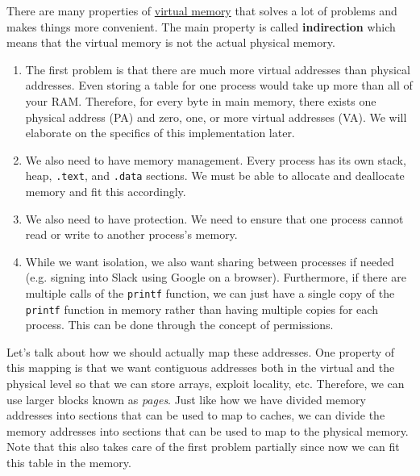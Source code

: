 \documentclass{article}
\begin{document}
    There are many properties of \hyperref[def:virtual-memory]{virtual memory} that solves a lot of problems and makes things more convenient. The main property is called \textbf{indirection} which means that the virtual memory is not the actual physical memory. 
    \begin{enumerate}
      \item The first problem is that there are much more virtual addresses than physical addresses. Even storing a table for one process would take up more than all of your RAM. Therefore, for every byte in main memory, there exists one physical address (PA) and zero, one, or more virtual addresses (VA). We will elaborate on the specifics of this implementation later. 
      \item We also need to have memory management. Every process has its own stack, heap, \texttt{.text}, and \texttt{.data} sections. We must be able to allocate and deallocate memory and fit this accordingly. 
      \item We also need to have protection. We need to ensure that one process cannot read or write to another process's memory.
      \item While we want isolation, we also want sharing between processes if needed (e.g. signing into Slack using Google on a browser). Furthermore, if there are multiple calls of the \texttt{printf} function, we can just have a single copy of the \texttt{printf} function in memory rather than having multiple copies for each process. This can be done through the concept of permissions. 
    \end{enumerate}

    Let's talk about how we should actually map these addresses. One property of this mapping is that we want contiguous addresses both in the virtual and the physical level so that we can store arrays, exploit locality, etc. Therefore, we can use larger blocks known as \textit{pages}. Just like how we have divided memory addresses into sections that can be used to map to caches, we can divide the memory addresses into sections that can be used to map to the physical memory. Note that this also takes care of the first problem partially since now we can fit this table in the memory. 
      
\end{document}
